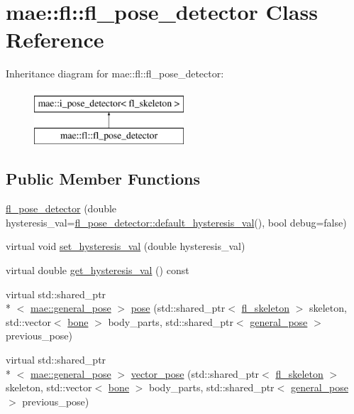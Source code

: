 \hypertarget{classmae_1_1fl_1_1fl__pose__detector}{\section{mae\-:\-:fl\-:\-:fl\-\_\-pose\-\_\-detector Class Reference}
\label{classmae_1_1fl_1_1fl__pose__detector}
}
Inheritance diagram for mae\-:\-:fl\-:\-:fl\-\_\-pose\-\_\-detector\-:\begin{figure}[H]
\begin{center}
\leavevmode
\includegraphics[height=2.000000cm]{classmae_1_1fl_1_1fl__pose__detector}
\end{center}
\end{figure}
\subsection*{Public Member Functions}
\begin{DoxyCompactItemize}
\item 
\hyperlink{classmae_1_1fl_1_1fl__pose__detector_a3e52ce649f55340ebcd5a2fec804278b}{fl\-\_\-pose\-\_\-detector} (double hysteresis\-\_\-val=\hyperlink{classmae_1_1fl_1_1fl__pose__detector_adb2f046d501a87de9e5589b346ef3782}{fl\-\_\-pose\-\_\-detector\-::default\-\_\-hysteresis\-\_\-val}(), bool debug=false)
\item 
virtual void \hyperlink{classmae_1_1fl_1_1fl__pose__detector_a807c41e01fed7a729058b91ff4ff90f3}{set\-\_\-hysteresis\-\_\-val} (double hysteresis\-\_\-val)
\item 
virtual double \hyperlink{classmae_1_1fl_1_1fl__pose__detector_a5347e97f3685d7168a182e7e373f09cf}{get\-\_\-hysteresis\-\_\-val} () const 
\item 
virtual std\-::shared\-\_\-ptr\\*
$<$ \hyperlink{classmae_1_1general__pose}{mae\-::general\-\_\-pose} $>$ \hyperlink{classmae_1_1fl_1_1fl__pose__detector_af8283b9b73fcc1bf7ea5a4220c2ecd55}{pose} (std\-::shared\-\_\-ptr$<$ \hyperlink{classmae_1_1fl_1_1fl__skeleton}{fl\-\_\-skeleton} $>$ skeleton, std\-::vector$<$ \hyperlink{classmae_1_1bone}{bone} $>$ body\-\_\-parts, std\-::shared\-\_\-ptr$<$ \hyperlink{classmae_1_1general__pose}{general\-\_\-pose} $>$ previous\-\_\-pose)
\item 
virtual std\-::shared\-\_\-ptr\\*
$<$ \hyperlink{classmae_1_1general__pose}{mae\-::general\-\_\-pose} $>$ \hyperlink{classmae_1_1fl_1_1fl__pose__detector_ae7f558696efe7f55cf4895bffd234665}{vector\-\_\-pose} (std\-::shared\-\_\-ptr$<$ \hyperlink{classmae_1_1fl_1_1fl__skeleton}{fl\-\_\-skeleton} $>$ skeleton, std\-::vector$<$ \hyperlink{classmae_1_1bone}{bone} $>$ body\-\_\-parts, std\-::shared\-\_\-ptr$<$ \hyperlink{classmae_1_1general__pose}{general\-\_\-pose} $>$ previous\-\_\-pose)
\end{DoxyCompactItemize}
